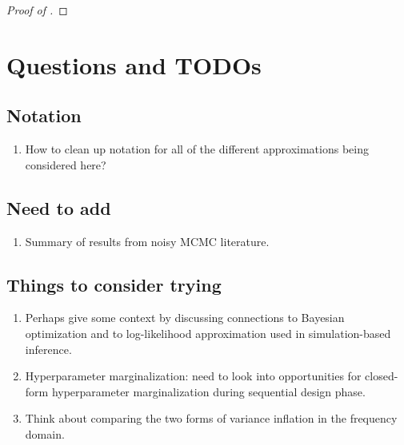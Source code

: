 \documentclass[12pt]{article}
\begin{document}
\begin{proof} [Proof of ]

\end{proof}




\section{Questions and TODOs}
\subsection{Notation}
\begin{enumerate}
\item How to clean up notation for all of the different approximations being considered here? 
\end{enumerate}

\subsection{Need to add}
\begin{enumerate}
\item Summary of results from noisy MCMC literature. 
\end{enumerate}

\subsection{Things to consider trying}
\begin{enumerate}
\item Perhaps give some context by discussing connections to Bayesian optimization and to log-likelihood approximation used in 
simulation-based inference. 
\item Hyperparameter marginalization: need to look into opportunities for closed-form hyperparameter marginalization during 
sequential design phase. 
\item Think about comparing the two forms of variance inflation in the frequency domain. 
\end{enumerate}


 

\end{document}
